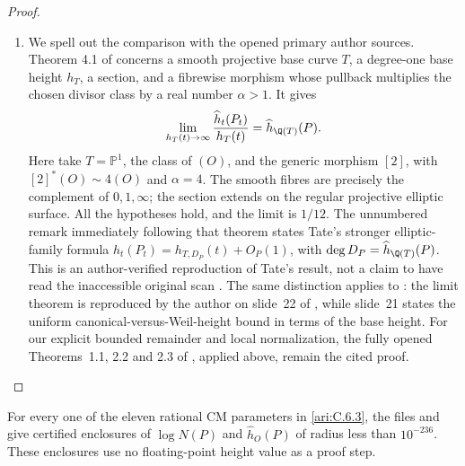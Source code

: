 \begin{proof}
\begin{enumerate}[label=\arabic*.,leftmargin=*]
\item We spell out the comparison with the opened primary author sources.
Theorem 4.1 of \citet[pp.~183--184]{callSilverman1993} concerns a
smooth projective base curve $T$, a degree-one base height $h_T$,
a section, and a fibrewise morphism whose pullback multiplies the
chosen divisor class by a real number $\alpha>1$. It gives
\[
 \lim_{h_T(t)\to\infty}
 \frac{\widehat h_t(P_t)}{h_T(t)}
       =\widehat h_{\Q(T)}(P).
\]
Here take $T=\mathbb P^1$, the class of $(O)$, and the generic
morphism $[2]$, with $[2]^*(O)\sim4(O)$ and $\alpha=4$.
The smooth fibres are precisely the complement of $0,1,\infty$;
the section extends on the regular projective elliptic surface.
All the hypotheses hold, and the limit is $1/12$.
The unnumbered remark immediately following that theorem states
Tate's stronger elliptic-family formula
$\widehat h_t(P_t)=h_{T,D_P}(t)+O_P(1)$, with
$\deg D_P=\widehat h_{\Q(T)}(P)$. This is an author-verified
reproduction of Tate's result, not a claim to have read the
inaccessible original scan \citep{tate1983variation}.
The same distinction applies to \citet{silverman1983specialization}:
the limit theorem is reproduced by the author on slide~22 of
\citet{silverman2006heights}, while slide~21 states the uniform
canonical-versus-Weil-height bound in terms of the base height.
For our explicit bounded remainder and local normalization, the
fully opened Theorems~1.1, 2.2 and 2.3 of
\citet{demarco2017}, applied above, remain the cited proof.
\end{enumerate}
\end{proof}

\begin{proposition}\label{ari:C.6.5}

For every one of the eleven rational CM parameters in \ref{ari:C.6.3},
the files  and
 give certified enclosures of
$\log N(P)$ and $\widehat h_O(P)$ of radius less than
$10^{-236}$. These enclosures use no floating-point height
value as a proof step.
\end{proposition}


